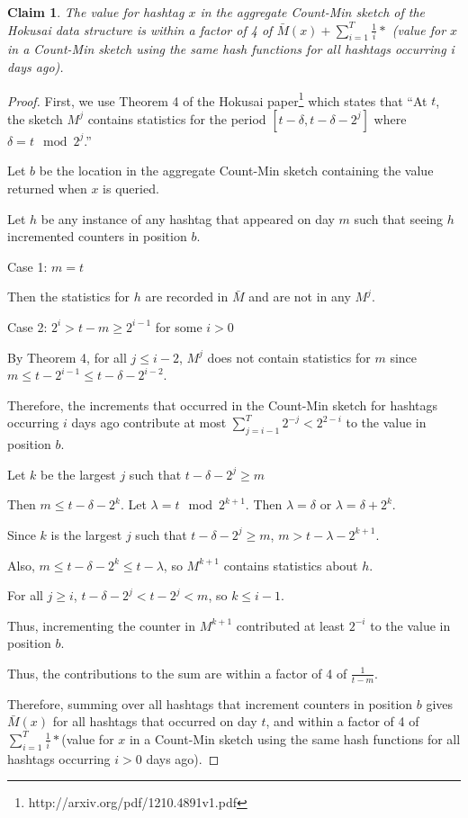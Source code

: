 \documentclass[a4paper,12pt]{article}
\newtheorem{claim}{Claim}
\begin{document}
\begin{claim}
The value for hashtag $x$ in the aggregate Count-Min sketch of the Hokusai data structure is within a factor of 4 of $\bar{M}(x) + \sum\limits_{i=1}^T \frac{1}{i}*$ (value for $x$ in a Count-Min sketch using the same hash functions for all hashtags occurring i days ago).
\end{claim}
\begin{proof}
First, we use Theorem 4 of the Hokusai paper\footnote{http://arxiv.org/pdf/1210.4891v1.pdf} which states that ``At $t$, the sketch $M^j$ contains statistics for the period $[t - \delta, t - \delta - 2^j]$ where $\delta = t \mod 2^j$.''

Let $b$ be the location in the aggregate Count-Min sketch containing the value returned when $x$ is queried.

Let $h$ be any instance of any hashtag that appeared on day $m$ such that seeing $h$ incremented counters in position $b$.

Case 1: $m=t$

Then the statistics for $h$ are recorded in $\bar{M}$ and are not in any $M^j$.

Case 2: $2^i > t-m \geq 2^{i-1}$ for some $i > 0$

By Theorem 4, for all $j \leq i - 2$, $M^j$ does not contain statistics for $m$ since $m \leq t - 2^{i-1} \leq t - \delta - 2^{i-2}$.

Therefore, the increments that occurred in the Count-Min sketch for hashtags occurring $i$ days ago contribute at most $\sum\limits_{j = i - 1}^{T} 2^{-j} < 2^{2-i}$ to the value in position $b$.

Let $k$ be the largest $j$ such that $t - \delta - 2^j \geq m$

Then $m \leq t - \delta - 2^k$.  Let $\lambda = t \mod 2^{k+1}$.  Then $\lambda = \delta$ or $\lambda = \delta + 2^k$.

Since $k$ is the largest $j$ such that $t - \delta - 2^j \geq m$, $m > t - \lambda - 2^{k+1}$.

Also, $m \leq t - \delta - 2^k \leq t - \lambda$, so $M^{k+1}$ contains statistics about $h$.

For all $j \geq i$, $t - \delta - 2^j < t - 2^j < m$, so $k \leq i - 1$. 

Thus, incrementing the counter in $M^{k + 1}$ contributed at least $2^{-i}$ to the value in position $b$.

Thus, the contributions to the sum are within a factor of 4 of $\frac{1}{t-m}$.

Therefore, summing over all hashtags that increment counters in position $b$ gives $\bar{M}(x)$ for all hashtags that occurred on day $t$, and within a factor of 4 of $\sum\limits_{i=1}^T \frac{1}{i}*$(value for $x$ in a Count-Min sketch using the same hash functions for all hashtags occurring $i > 0$ days ago). 
\end{proof}
\end{document}
